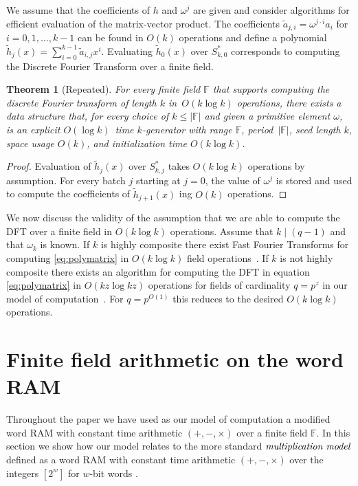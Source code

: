 \documentclass[a4paper,11pt]{article}
\theoremstyle{plain}
\newtheorem{restate}{Theorem}
\theoremstyle{definition}
\newcommand{\F}{\mathbb{F}}
\begin{document}
We assume that the coefficients of $h$ and $\omega^{j}$ are given and consider algorithms for efficient evaluation of the matrix-vector product.
The coefficients $\tilde{a}_{j,i} = \omega^{j \cdot i}a_{i}$ for $i = 0,1,\dots,k-1$ can be found in $O(k)$ operations and define a polynomial $\tilde{h}_{j}(x) = \sum_{i=0}^{k-1}\tilde{a}_{i,j}x^{i}$. 
Evaluating $\tilde{h}_{0}(x)$ over $S_{k,0}^{*}$ corresponds to computing the Discrete Fourier Transform over a finite field.
\begin{restate}[Repeated] 
For every finite field $\F$ that supports computing the discrete Fourier transform of length $k$ in~$O(k \log k)$ operations, 
there exists a data structure that, for every choice of $k \leq |\F|$ and given a primitive element $\omega$, 
is an explicit $O(\log k)$~time $k$-generator with range $\F$, period~$|\F|$, seed length $k$, space usage $O(k)$, and initialization time $O(k \log k)$.
\end{restate}
\begin{proof}
Evaluation of $\tilde{h}_{j}(x)$ over $S_{k,j}^{*}$ takes $O(k \log k)$ operations by assumption. 
For every batch $j$ starting at $j = 0$, the value of $\omega^{j}$ is stored and used to compute the coefficients of $\tilde{h}_{j+1}(x)$ ing $O(k)$ operations.
\end{proof}
We now discuss the validity of the assumption that we are able to compute the DFT over a finite field in $O(k \log k)$ operations.
Assume that $k \mid (q - 1)$ and that $\omega_{k}$ is known.
If $k$ is highly composite there exist Fast Fourier Transforms for computing \eqref{eq:polymatrix} in $O(k \log k)$ field operations~\cite{duhamel1990}.
If $k$ is not highly composite there exists an algorithm for computing the DFT in equation \eqref{eq:polymatrix} in $O(kz \log kz )$ operations for fields of cardinality $q = p^{z}$ in our model of computation~\cite{preparata1977}. 
For $q = p^{O(1)}$ this reduces to the desired $O(k \log k)$ operations.
\section{Finite field arithmetic on the word RAM} \label{sec:wordRAM}
Throughout the paper we have used as our model of computation a modified word RAM with constant time arithmetic $(+,-, \times)$ over a finite field $\F$.
In this section we show how our model relates to the more standard $\emph{multiplication model}$ defined as a word RAM with constant time arithmetic $(+, -, \times)$ over the integers $[2^{w}]$ for $w$-bit words \cite{hagerup1998}.
\end{document}
